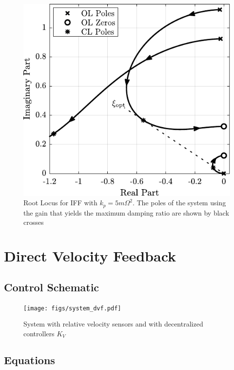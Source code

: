 \documentclass{ISMA_USD2020}
\begin{document}
\begin{figure}[htbp]
\centering
\includegraphics[scale=1]{figs/root_locus_opt_gain_iff_kp.pdf}
\caption{\label{fig:root_locus_opt_gain_iff_kp}Root Locus for IFF with \(k_p = 5 m \Omega^2\). The poles of the system using the gain that yields the maximum damping ratio are shown by black crosses}
\end{figure}

\section{Direct Velocity Feedback}
\label{sec:org6904969}
\subsection{Control Schematic}
\label{sec:org103e18b}

\begin{figure}[htbp]
\centering
\texttt{[image: figs/system\_dvf.pdf]}
\caption{\label{fig:system_dvf}System with relative velocity sensors and with decentralized controllers \(K_V\)}
\end{figure}


\subsection{Equations}
\label{sec:org793c22d}
\end{document}
